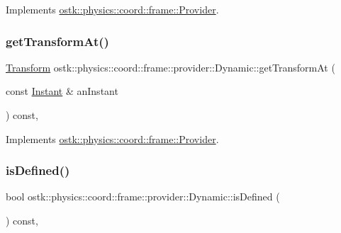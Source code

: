 Implements \hyperlink{classostk_1_1physics_1_1coord_1_1frame_1_1_provider_ae41bc3862d088e9c8d90a79253294ce9}{ostk\+::physics\+::coord\+::frame\+::\+Provider}.

\mbox{\label{classostk_1_1physics_1_1coord_1_1frame_1_1provider_1_1_dynamic_a7b7bfc8957fd84d90d0479944a427005}} 
\subsubsection{\texorpdfstring{get\+Transform\+At()}{getTransformAt()}}
{\footnotesize\ttfamily \hyperlink{classostk_1_1physics_1_1coord_1_1_transform}{Transform} ostk\+::physics\+::coord\+::frame\+::provider\+::\+Dynamic\+::get\+Transform\+At (\begin{DoxyParamCaption}\item[{const \hyperlink{classostk_1_1physics_1_1time_1_1_instant}{Instant} \&}]{an\+Instant }\end{DoxyParamCaption}) const\hspace{0.3cm}{\ttfamily [override]}, {\ttfamily [virtual]}}



Implements \hyperlink{classostk_1_1physics_1_1coord_1_1frame_1_1_provider_a38b86a589f46f8b8a9c97ab2776f37d1}{ostk\+::physics\+::coord\+::frame\+::\+Provider}.

\mbox{\label{classostk_1_1physics_1_1coord_1_1frame_1_1provider_1_1_dynamic_ab01d8d9a09df8e46680eb1acb830a86c}} 
\subsubsection{\texorpdfstring{is\+Defined()}{isDefined()}}
{\footnotesize\ttfamily bool ostk\+::physics\+::coord\+::frame\+::provider\+::\+Dynamic\+::is\+Defined (\begin{DoxyParamCaption}{ }\end{DoxyParamCaption}) const\hspace{0.3cm}{\ttfamily [override]}, {\ttfamily [virtual]}}




